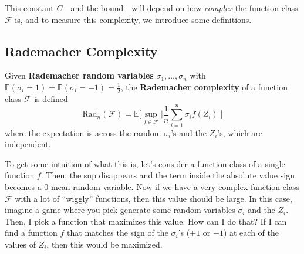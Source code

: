   This constant $C$---and the bound---will depend on how \textit{complex} the function class $\mathcal{F}$ is, and to measure this complexity, we introduce some definitions. 

\subsection{Rademacher Complexity}

  \begin{definition}
    Given \textbf{Rademacher random variables} $\sigma_1, \ldots, \sigma_n$ with $\mathbb{P}(\sigma_i = 1) = \mathbb{P}(\sigma_i = -1) = \frac{1}{2}$, the \textbf{Rademacher complexity} of a function class $\mathcal{F}$ is defined 
    \begin{equation}
      \mathrm{Rad}_n (\mathcal{F}) = \mathbb{E} \bigg[ \sup_{f \in \mathcal{F}} \bigg| \frac{1}{n} \sum_{i=1}^n \sigma_i f(Z_i) \bigg| \bigg]
    \end{equation}
    where the expectation is across the random $\sigma_i$'s and the $Z_i$'s, which are independent. 
  \end{definition}

  To get some intuition of what this is, let's consider a function class of a single function $f$. Then, the sup disappears and the term inside the absolute value sign becomes a $0$-mean random variable. Now if we have a very complex function class $\mathcal{F}$ with a lot of ``wiggly'' functions, then this value should be large. In this case, imagine a game where you pick generate some random variables $\sigma_i$ and the $Z_i$. Then, I pick a function that maximizes this value. How can I do that? If I can find a function $f$ that matches the sign of the $\sigma_i$'s ($+1$ or $-1$) at each of the values of $Z_i$, then this would be maximized. 

